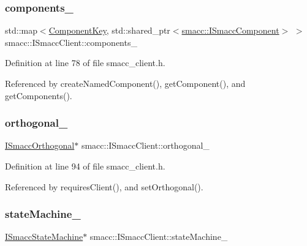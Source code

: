 \subsubsection{\texorpdfstring{components\+\_\+}{components\_}}
{\footnotesize\ttfamily std\+::map$<$\hyperlink{structsmacc_1_1ComponentKey}{Component\+Key}, std\+::shared\+\_\+ptr$<$\hyperlink{classsmacc_1_1ISmaccComponent}{smacc\+::\+I\+Smacc\+Component}$>$ $>$ smacc\+::\+I\+Smacc\+Client\+::components\+\_\+\hspace{0.3cm}{\ttfamily [protected]}}



Definition at line 78 of file smacc\+\_\+client.\+h.



Referenced by create\+Named\+Component(), get\+Component(), and get\+Components().

\mbox{\label{classsmacc_1_1ISmaccClient_a571c7f672d9c90128b5498aefc27c136}} 
\subsubsection{\texorpdfstring{orthogonal\+\_\+}{orthogonal\_}}
{\footnotesize\ttfamily \hyperlink{classsmacc_1_1ISmaccOrthogonal}{I\+Smacc\+Orthogonal}$\ast$ smacc\+::\+I\+Smacc\+Client\+::orthogonal\+\_\+\hspace{0.3cm}{\ttfamily [private]}}



Definition at line 94 of file smacc\+\_\+client.\+h.



Referenced by requires\+Client(), and set\+Orthogonal().

\mbox{\label{classsmacc_1_1ISmaccClient_a926e4f2ae796def63d48dca389a48c47}} 
\subsubsection{\texorpdfstring{state\+Machine\+\_\+}{stateMachine\_}}
{\footnotesize\ttfamily \hyperlink{classsmacc_1_1ISmaccStateMachine}{I\+Smacc\+State\+Machine}$\ast$ smacc\+::\+I\+Smacc\+Client\+::state\+Machine\+\_\+\hspace{0.3cm}{\ttfamily [private]}}



